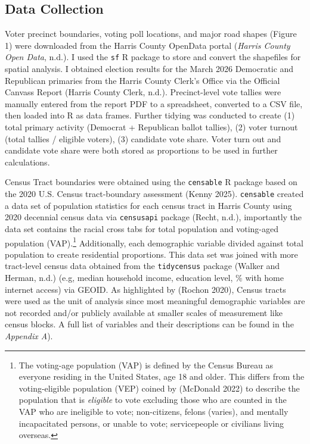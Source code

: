 \documentclass[
]{article}
\begin{document}
\subsection{Data Collection}\label{data-collection}

Voter precinct boundaries, voting poll locations, and major road shapes
(Figure 1) were downloaded from the Harris County OpenData portal
(\emph{Harris County Open Data}, n.d.). I used the \texttt{sf} R package
to store and convert the shapefiles for spatial analysis. I obtained
election results for the March 2026 Democratic and Republican primaries
from the Harris County Clerk's Office via the Official Canvass Report
(Harris County Clerk, n.d.). Precinct-level vote tallies were manually
entered from the report PDF to a spreadsheet, converted to a CSV file,
then loaded into R as data frames. Further tidying was conducted to
create (1) total primary activity (Democrat + Republican ballot
tallies), (2) voter turnout (total tallies / eligible voters), (3)
candidate vote share. Voter turn out and candidate vote share were both
stored as proportions to be used in further calculations.

Census Tract boundaries were obtained using the \texttt{censable} R
package based on the 2020 U.S. Census tract-boundary assessment (Kenny
2025). \texttt{censable} created a data set of population statistics for
each census tract in Harris County using 2020 decennial census data via
\texttt{censusapi} package (Recht, n.d.), importantly the data set
contains the racial cross tabs for total population and voting-aged
population (VAP).\footnote{The voting-age population (VAP) is defined by
  the Census Bureau as everyone residing in the United States, age 18
  and older. This differs from the voting-eligible population (VEP)
  coined by (McDonald 2022) to describe the population that is
  \emph{eligible} to vote excluding those who are counted in the VAP who
  are ineligible to vote; non-citizens, felons (varies), and mentally
  incapacitated persons, or unable to vote; servicepeople or civilians
  living overseas.} Additionally, each demographic variable divided
against total population to create residential proportions. This data
set was joined with more tract-level census data obtained from the
\texttt{tidycensus} package (Walker and Herman, n.d.) (e.g, median
household income, education level, \% with home internet access) via
GEOID. As highlighted by (Rochon 2020), Census tracts were used as the
unit of analysis since most meaningful demographic variables are not
recorded and/or publicly available at smaller scales of measurement like
census blocks. A full list of variables and their descriptions can be
found in the \emph{Appendix A}).
\end{document}
